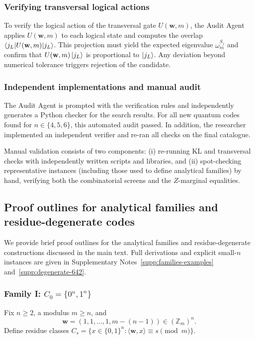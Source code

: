 \documentclass[pdflatex,sn-nature]{sn-jnl}%
\theoremstyle{thmstyleone}%
\theoremstyle{thmstyletwo}%
\theoremstyle{thmstylethree}%
\begin{document}
\subsubsection{Verifying transversal logical actions}

To verify the logical action of the transversal gate $U(\mathbf w,m)$, the Audit Agent applies $U(\mathbf w,m)$ to each logical state and computes the overlap
$\braket{j_L | U(\mathbf w,m) | j_L}$. This projection must yield the expected eigenvalue $\omega_m^{S_j}$ and confirm that $U(\mathbf w,m)\ket{j_L}$ is proportional to $\ket{j_L}$. Any deviation beyond numerical tolerance triggers rejection of the candidate.

\subsubsection{Independent implementations and manual audit}

The Audit Agent is prompted with the verification rules and independently generates a Python checker for the search results. For all new quantum codes found for $n\in\{4,5,6\}$, this automated audit passed. In addition, the researcher implemented an independent verifier and re-ran all checks on the final catalogue.

Manual validation consists of two components: (i) re-running KL and transversal checks with independently written scripts and libraries, and (ii) spot-checking representative instances (including those used to define analytical families) by hand, verifying both the combinatorial screens and the $Z$-marginal equalities.

\subsection{Proof outlines for analytical families and residue-degenerate codes}
\label{subsec:families-methods}

We provide brief proof outlines for the analytical families and residue-degenerate constructions discussed in the main text. Full derivations and explicit small-$n$ instances are given in Supplementary Notes~\ref{supp:families-examples} and~\ref{supp:degenerate-642}.


\subsubsection{Family I: $C_0=\{0^n,1^n\}$}
\label{subsubsec:proof_family_1}

Fix $n\ge 2$, a modulus $m\ge n$, and
\[
  \mathbf w=(1,1,\dots,1,m-(n-1))\in(\mathbb Z_m)^n.
\]
Define residue classes
$C_s=\{x\in\{0,1\}^n : \langle \mathbf w,x\rangle \equiv s \pmod m\}$.
\end{document}
